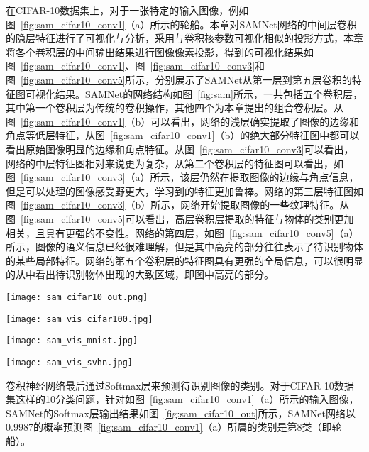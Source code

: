 在CIFAR-10数据集上，对于一张特定的输入图像，例如图~\ref{fig:sam_cifar10_conv1}（a）所示的轮船。本章对SAMNet网络的中间层卷积的隐层特征进行了可视化与分析，采用与卷积核参数可视化相似的投影方式，本章将各个卷积层的中间输出结果进行图像像素投影，得到的可视化结果如图~\ref{fig:sam_cifar10_conv1}、图~\ref{fig:sam_cifar10_conv3}和图~\ref{fig:sam_cifar10_conv5}所示，分别展示了SAMNet从第一层到第五层卷积的特征图可视化结果。SAMNet的网络结构如图~\ref{fig:sam}所示，一共包括五个卷积层，其中第一个卷积层为传统的卷积操作，其他四个为本章提出的组合卷积层。从图~\ref{fig:sam_cifar10_conv1}（b）可以看出，网络的浅层确实提取了图像的边缘和角点等低层特征，从图~\ref{fig:sam_cifar10_conv1}（b）的绝大部分特征图中都可以看出原始图像明显的边缘和角点特征。从图~\ref{fig:sam_cifar10_conv3}可以看出，网络的中层特征图相对来说更为复杂，从第二个卷积层的特征图可以看出，如图~\ref{fig:sam_cifar10_conv3}（a）所示，该层仍然在提取图像的边缘与角点信息，但是可以处理的图像感受野更大，学习到的特征更加鲁棒。网络的第三层特征图如图~\ref{fig:sam_cifar10_conv3}（b）所示，网络开始提取图像的一些纹理特征。从图~\ref{fig:sam_cifar10_conv5}可以看出，高层卷积层提取的特征与物体的类别更加相关，且具有更强的不变性。网络的第四层，如图~\ref{fig:sam_cifar10_conv5}（a）所示，图像的语义信息已经很难理解，但是其中高亮的部分往往表示了待识别物体的某些局部特征。网络的第五个卷积层的特征图具有更强的全局信息，可以很明显的从中看出待识别物体出现的大致区域，即图中高亮的部分。

\begin{figure*}
\centering
\texttt{[image: sam\_cifar10\_out.png]}
\caption{Softmax层各类别预测概率输出。}
\label{fig:sam_cifar10_out}
\end{figure*}

\begin{figure*}
\centering
\texttt{[image: sam\_vis\_cifar100.jpg]}
\caption{CIFAR-100卷积层特征可视化。}
\label{fig:sam_vis_cifar100}
\end{figure*}

\begin{figure*}
\centering
\texttt{[image: sam\_vis\_mnist.jpg]}
\caption{MNIST卷积层特征可视化。}
\label{fig:sam_vis_mnist}
\end{figure*}

\begin{figure*}
\centering
\texttt{[image: sam\_vis\_svhn.jpg]}
\caption{SVHN卷积层特征可视化。}
\label{fig:sam_vis_svhn}
\end{figure*}


卷积神经网络最后通过Softmax层来预测待识别图像的类别。对于CIFAR-10数据集这样的10分类问题，针对如图~\ref{fig:sam_cifar10_conv1}（a）所示的输入图像，SAMNet的Softmax层输出结果如图~\ref{fig:sam_cifar10_out}所示，SAMNet网络以0.9987的概率预测图~\ref{fig:sam_cifar10_conv1}（a）所属的类别是第8类（即轮船）。

